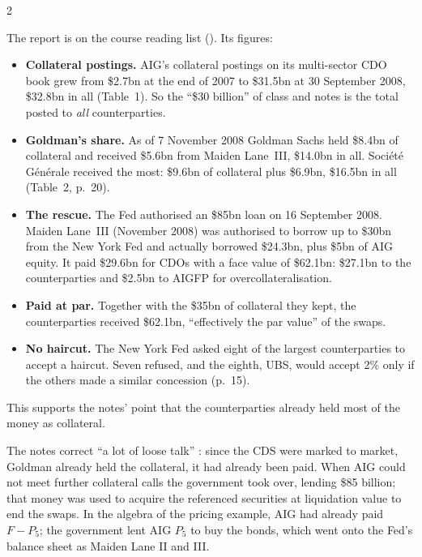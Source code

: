 \begin{paracol}{2}
\begin{coursenote}
The report is on the course reading list (). Its figures:
\begin{itemize}
  \item \textbf{Collateral postings.} AIG's collateral postings on its multi-sector CDO book grew from \$2.7bn at the end of 2007 to \$31.5bn at 30 September 2008, \$32.8bn in all (Table~1). So the ``\$30 billion'' of class and notes is the total posted to \emph{all} counterparties.
  \item \textbf{Goldman's share.} As of 7 November 2008 Goldman Sachs held \$8.4bn of collateral and received \$5.6bn from Maiden Lane~III, \$14.0bn in all. Soci\'et\'e G\'en\'erale received the most: \$9.6bn of collateral plus \$6.9bn, \$16.5bn in all (Table~2, p.~20).
  \item \textbf{The rescue.} The Fed authorised an \$85bn loan on 16 September 2008. Maiden Lane~III (November 2008) was authorised to borrow up to \$30bn from the New York Fed and actually borrowed \$24.3bn, plus \$5bn of AIG equity. It paid \$29.6bn for CDOs with a face value of \$62.1bn: \$27.1bn to the counterparties and \$2.5bn to AIGFP for overcollateralisation.
  \item \textbf{Paid at par.} Together with the \$35bn of collateral they kept, the counterparties received \$62.1bn, ``effectively the par value'' of the swaps.
  \item \textbf{No haircut.} The New York Fed asked eight of the largest counterparties to accept a haircut. Seven refused, and the eighth, UBS, would accept 2\% only if the others made a similar concession (p.~15).
\end{itemize}
This supports the notes' point that the counterparties already held most of the money as collateral.
\end{coursenote}

\begin{intuition}
The notes correct ``a lot of loose talk'' : since the CDS were marked to market, Goldman already held the collateral, it had already been paid. When AIG could not meet further collateral
calls the government took over, lending \$85 billion; that money was used to acquire the referenced securities at liquidation value to end the swaps. In the algebra of the pricing example, AIG had
already paid $F-P_5$; the government lent AIG $P_5$ to buy the bonds, which went onto the Fed's balance sheet as Maiden Lane II and III.
\end{intuition}


\end{paracol}
